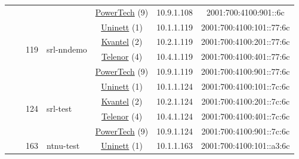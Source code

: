 \begin{small}
\begin{center}
\begin{longtable}{|c|c|c|c|c|c|c|c|}
  &  & \multicolumn{2}{|c|}{} & \multicolumn{2}{|c|}{\tiny{\href{http://www.powertech.no}{PowerTech} (9)}} & \tiny{10.9.1.108} & \tiny{2001:700:4100:901::6c} \\* \cline{3-3}\cline{4-4}\cline{5-5}\cline{6-6}\cline{7-7}\cline{8-8}
  &  & \multirow{4}{*}{\tiny{119}} & \multicolumn{1}{|l|}{\multirow{4}{*}{\tiny{srl-nndemo}}} & \multicolumn{2}{|c|}{\tiny{\href{https://www.uninett.no}{Uninett} (1)}} & \tiny{10.1.1.119} & \tiny{2001:700:4100:101::77:6c} \\* \cline{5-5}\cline{6-6}\cline{7-7}\cline{8-8}
  &  &  &  & \multicolumn{2}{|c|}{\tiny{\href{http://kvantel.no}{Kvantel} (2)}} & \tiny{10.2.1.119} & \tiny{2001:700:4100:201::77:6c} \\* \cline{5-5}\cline{6-6}\cline{7-7}\cline{8-8}
  &  &  &  & \multicolumn{2}{|c|}{\tiny{\href{https://www.telenor.no}{Telenor} (4)}} & \tiny{10.4.1.119} & \tiny{2001:700:4100:401::77:6c} \\* \cline{5-5}\cline{6-6}\cline{7-7}\cline{8-8}
  &  &  &  & \multicolumn{2}{|c|}{\tiny{\href{http://www.powertech.no}{PowerTech} (9)}} & \tiny{10.9.1.119} & \tiny{2001:700:4100:901::77:6c} \\* \cline{3-3}\cline{4-4}\cline{5-5}\cline{6-6}\cline{7-7}\cline{8-8}
  &  & \multirow{4}{*}{\tiny{124}} & \multicolumn{1}{|l|}{\multirow{4}{*}{\tiny{srl-test}}} & \multicolumn{2}{|c|}{\tiny{\href{https://www.uninett.no}{Uninett} (1)}} & \tiny{10.1.1.124} & \tiny{2001:700:4100:101::7c:6c} \\* \cline{5-5}\cline{6-6}\cline{7-7}\cline{8-8}
  &  &  &  & \multicolumn{2}{|c|}{\tiny{\href{http://kvantel.no}{Kvantel} (2)}} & \tiny{10.2.1.124} & \tiny{2001:700:4100:201::7c:6c} \\* \cline{5-5}\cline{6-6}\cline{7-7}\cline{8-8}
  &  &  &  & \multicolumn{2}{|c|}{\tiny{\href{https://www.telenor.no}{Telenor} (4)}} & \tiny{10.4.1.124} & \tiny{2001:700:4100:401::7c:6c} \\* \cline{5-5}\cline{6-6}\cline{7-7}\cline{8-8}
  &  &  &  & \multicolumn{2}{|c|}{\tiny{\href{http://www.powertech.no}{PowerTech} (9)}} & \tiny{10.9.1.124} & \tiny{2001:700:4100:901::7c:6c} \\* \cline{3-3}\cline{4-4}\cline{5-5}\cline{6-6}\cline{7-7}\cline{8-8}
  &  & \multirow{4}{*}{\tiny{163}} & \multicolumn{1}{|l|}{\multirow{4}{*}{\tiny{ntnu-test}}} & \multicolumn{2}{|c|}{\tiny{\href{https://www.uninett.no}{Uninett} (1)}} & \tiny{10.1.1.163} & \tiny{2001:700:4100:101::a3:6c} \\* \cline{5-5}\cline{6-6}\cline{7-7}\cline{8-8}

\end{longtable}
\end{center}
\end{small}
